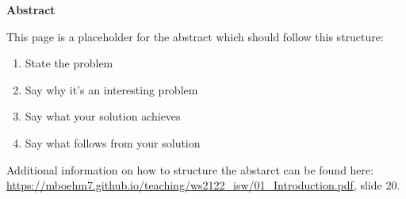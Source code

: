 \thispagestyle{empty}
\vspace*{1.0cm}

\begin{center}
    \textbf{Abstract} \label{abstract}
\end{center}

\vspace*{0.5cm}

\noindent
This page is a placeholder for the abstract which should follow this structure:

\begin{enumerate}
    \item State the problem
    \item Say why it's an interesting problem
    \item Say what your solution achieves
    \item Say what follows from your solution
\end{enumerate}

Additional information on how to structure the abstarct can be found here: \url{https://mboehm7.github.io/teaching/ws2122_isw/01_Introduction.pdf}, slide 20.